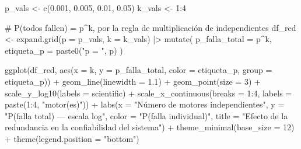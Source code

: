 \documentclass[
  spanish,
  letterpaper,
  DIV=11,
  numbers=noendperiod]{scrartcl}
\newenvironment{Shaded}{\begin{snugshade}}{\end{snugshade}}
\newcommand{\AttributeTok}[1]{\textcolor[rgb]{0.40,0.45,0.13}{#1}}
\newcommand{\CommentTok}[1]{\textcolor[rgb]{0.37,0.37,0.37}{#1}}
\newcommand{\DecValTok}[1]{\textcolor[rgb]{0.68,0.00,0.00}{#1}}
\newcommand{\FloatTok}[1]{\textcolor[rgb]{0.68,0.00,0.00}{#1}}
\newcommand{\FunctionTok}[1]{\textcolor[rgb]{0.28,0.35,0.67}{#1}}
\newcommand{\NormalTok}[1]{\textcolor[rgb]{0.00,0.23,0.31}{#1}}
\newcommand{\OtherTok}[1]{\textcolor[rgb]{0.00,0.23,0.31}{#1}}
\newcommand{\SpecialCharTok}[1]{\textcolor[rgb]{0.37,0.37,0.37}{#1}}
\newcommand{\StringTok}[1]{\textcolor[rgb]{0.13,0.47,0.30}{#1}}
\begin{document}
\begin{Shaded}
\begin{Highlighting}[]
\NormalTok{p\_vals }\OtherTok{\textless{}{-}} \FunctionTok{c}\NormalTok{(}\FloatTok{0.001}\NormalTok{, }\FloatTok{0.005}\NormalTok{, }\FloatTok{0.01}\NormalTok{, }\FloatTok{0.05}\NormalTok{)}
\NormalTok{k\_vals }\OtherTok{\textless{}{-}} \DecValTok{1}\SpecialCharTok{:}\DecValTok{4}

\CommentTok{\# P(todos fallen) = p\^{}k, por la regla de multiplicación de independientes}
\NormalTok{df\_red }\OtherTok{\textless{}{-}} \FunctionTok{expand.grid}\NormalTok{(}\AttributeTok{p =}\NormalTok{ p\_vals, }\AttributeTok{k =}\NormalTok{ k\_vals) }\SpecialCharTok{|\textgreater{}}
  \FunctionTok{mutate}\NormalTok{(}
    \AttributeTok{p\_falla\_total =}\NormalTok{ p}\SpecialCharTok{\^{}}\NormalTok{k,}
    \AttributeTok{etiqueta\_p    =} \FunctionTok{paste0}\NormalTok{(}\StringTok{"p = "}\NormalTok{, p)}
\NormalTok{  )}

\FunctionTok{ggplot}\NormalTok{(df\_red, }\FunctionTok{aes}\NormalTok{(}\AttributeTok{x =}\NormalTok{ k, }\AttributeTok{y =}\NormalTok{ p\_falla\_total,}
                   \AttributeTok{color =}\NormalTok{ etiqueta\_p, }\AttributeTok{group =}\NormalTok{ etiqueta\_p)) }\SpecialCharTok{+}
  \FunctionTok{geom\_line}\NormalTok{(}\AttributeTok{linewidth =} \FloatTok{1.1}\NormalTok{) }\SpecialCharTok{+}
  \FunctionTok{geom\_point}\NormalTok{(}\AttributeTok{size =} \DecValTok{3}\NormalTok{) }\SpecialCharTok{+}
  \FunctionTok{scale\_y\_log10}\NormalTok{(}\AttributeTok{labels =}\NormalTok{ scientific) }\SpecialCharTok{+}
  \FunctionTok{scale\_x\_continuous}\NormalTok{(}\AttributeTok{breaks =} \DecValTok{1}\SpecialCharTok{:}\DecValTok{4}\NormalTok{,}
                     \AttributeTok{labels =} \FunctionTok{paste}\NormalTok{(}\DecValTok{1}\SpecialCharTok{:}\DecValTok{4}\NormalTok{, }\StringTok{"motor(es)"}\NormalTok{)) }\SpecialCharTok{+}
  \FunctionTok{labs}\NormalTok{(}\AttributeTok{x =} \StringTok{"Número de motores independientes"}\NormalTok{,}
       \AttributeTok{y =} \StringTok{"P(falla total) — escala log"}\NormalTok{,}
       \AttributeTok{color =} \StringTok{"P(falla individual)"}\NormalTok{,}
       \AttributeTok{title =} \StringTok{"Efecto de la redundancia en la confiabilidad del sistema"}\NormalTok{) }\SpecialCharTok{+}
  \FunctionTok{theme\_minimal}\NormalTok{(}\AttributeTok{base\_size =} \DecValTok{12}\NormalTok{) }\SpecialCharTok{+}
  \FunctionTok{theme}\NormalTok{(}\AttributeTok{legend.position =} \StringTok{"bottom"}\NormalTok{)}
\end{Highlighting}
\end{Shaded}
\end{document}
